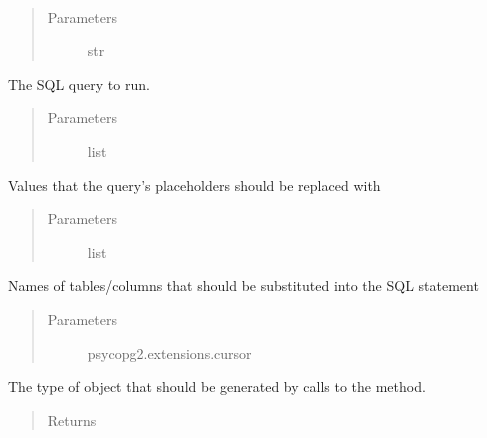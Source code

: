 \documentclass[letterpaper,10pt,english]{sphinxmanual}
\begin{document}
\begin{fulllineitems}
\begin{fulllineitems}
\label{\detokenize{tiger_leagues/models/readme:tiger_leagues.models.db_model.Database.execute}}~\begin{quote}\begin{description}
\item[{Parameters}] \leavevmode
{} \textendash{} str

\end{description}\end{quote}

The SQL query to run.
\begin{quote}\begin{description}
\item[{Parameters}] \leavevmode
{} \textendash{} list

\end{description}\end{quote}

Values that the query’s placeholders should be replaced with
\begin{quote}\begin{description}
\item[{Parameters}] \leavevmode
{} \textendash{} list

\end{description}\end{quote}

Names of tables/columns that should be substituted into the SQL statement
\begin{quote}\begin{description}
\item[{Parameters}] \leavevmode
{} \textendash{} psycopg2.extensions.cursor

\end{description}\end{quote}

The type of object that should be generated by calls to the  
method.
\begin{quote}\begin{description}
\item[{Returns}] \leavevmode
{}


\end{description}
\end{quote}
\end{fulllineitems}
\end{fulllineitems}
\end{document}
